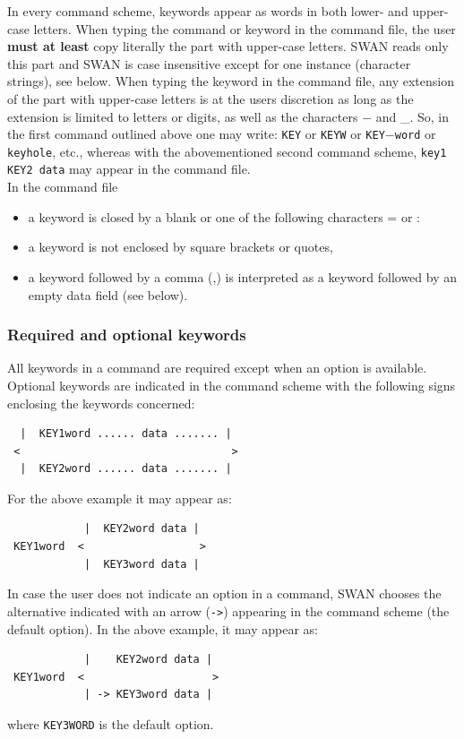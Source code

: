 \documentclass[12pt]{book}
\begin{document}
In every command scheme, keywords appear as words in both lower- and upper-case letters. When typing the command or
keyword in the command file, the user {\bf must at least} copy literally the part with upper-case letters. SWAN reads
only this part and SWAN is case insensitive except for one instance (character strings), see below. When typing the
keyword in the command file, any extension of the part with upper-case letters is at the users discretion as long as
the extension is limited to letters or digits, as well as the characters $-$ and \_. So, in the first command outlined
above one may write: {\tt KEY} or {\tt KEYW} or {\tt KEY}$-${\tt word} or {\tt keyhole}, etc., whereas with the
abovementioned second command scheme, {\tt key1 KEY2 data} may appear in the command file.
\\[2ex]
\noindent
In the command file
\begin{itemize}
  \item a keyword is closed by a blank or one of the following characters = or :
  \item a keyword is not enclosed by square brackets or quotes,
  \item a keyword followed by a comma (,) is interpreted as a keyword followed by an empty data field (see below).
\end{itemize}

\subsubsection{Required and optional keywords}

All keywords in a command are required except when an option is available.
\\[2ex]
\noindent
Optional keywords are indicated in the command scheme with the following signs enclosing the keywords concerned:
\begin{verbatim}
  |  KEY1word ...... data ....... |
 <                                 >
  |  KEY2word ...... data ....... |
\end{verbatim}
For the above example it may appear as:
\begin{verbatim}
            |  KEY2word data |
 KEY1word  <                  >
            |  KEY3word data |
\end{verbatim}
In case the user does not indicate an option in a command, SWAN chooses the alternative indicated with an arrow ({\tt ->})
appearing in the command scheme (the default option). In the above example, it may appear as:
\begin{verbatim}
            |    KEY2word data |
 KEY1word  <                    >
            | -> KEY3word data |
\end{verbatim}
where {\tt KEY3WORD} is the default option.
\end{document}
